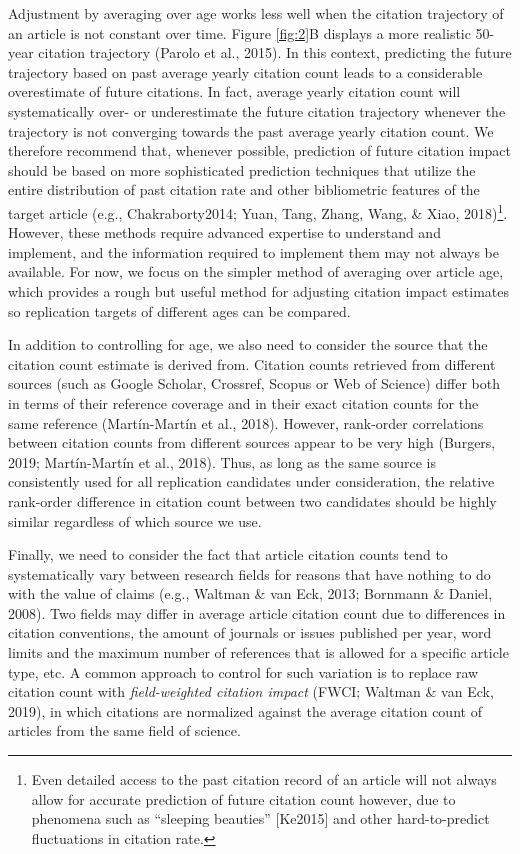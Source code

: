 \documentclass[
  english,
  jou,floatsintext]{apa6}
\begin{document}
Adjustment by averaging over age works less well when the citation trajectory of an article is not constant over time. Figure \ref{fig:2}B displays a more realistic 50-year citation trajectory (Parolo et al., 2015). In this context, predicting the future trajectory based on past average yearly citation count leads to a considerable overestimate of future citations. In fact, average yearly citation count will systematically over- or underestimate the future citation trajectory whenever the trajectory is not converging towards the past average yearly citation count. We therefore recommend that, whenever possible, prediction of future citation impact should be based on more sophisticated prediction techniques that utilize the entire distribution of past citation rate and other bibliometric features of the target article (e.g., Chakraborty2014; Yuan, Tang, Zhang, Wang, \& Xiao, 2018)\footnote{Even detailed access to the past citation record of an article will not always allow for accurate prediction of future citation count however, due to phenomena such as ``sleeping beauties'' {[}Ke2015{]} and other hard-to-predict fluctuations in citation rate.}. However, these methods require advanced expertise to understand and implement, and the information required to implement them may not always be available. For now, we focus on the simpler method of averaging over article age, which provides a rough but useful method for adjusting citation impact estimates so replication targets of different ages can be compared.

In addition to controlling for age, we also need to consider the source that the citation count estimate is derived from. Citation counts retrieved from different sources (such as Google Scholar, Crossref, Scopus or Web of Science) differ both in terms of their reference coverage and in their exact citation counts for the same reference (Martín-Martín et al., 2018). However, rank-order correlations between citation counts from different sources appear to be very high (Burgers, 2019; Martín-Martín et al., 2018). Thus, as long as the same source is consistently used for all replication candidates under consideration, the relative rank-order difference in citation count between two candidates should be highly similar regardless of which source we use.

Finally, we need to consider the fact that article citation counts tend to systematically vary between research fields for reasons that have nothing to do with the value of claims (e.g., Waltman \& van Eck, 2013; Bornmann \& Daniel, 2008). Two fields may differ in average article citation count due to differences in citation conventions, the amount of journals or issues published per year, word limits and the maximum number of references that is allowed for a specific article type, etc. A common approach to control for such variation is to replace raw citation count with \emph{field-weighted citation impact} (FWCI; Waltman \& van Eck, 2019), in which citations are normalized against the average citation count of articles from the same field of science.
\end{document}
